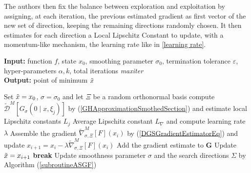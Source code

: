 The authors then fix the balance between exploration and exploitation by assigning, at each iteration, the previous estimated
gradient as first vector of the new set of direction, keeping the remaining directions randomly chosen. It then
estimates for each direction a Local Lipschitz Constant to update, with a momentum-like mechanism, the learning rate like in \ref{learning rate}.

\begin{algorithm}[!ht]
	\caption{ASGF algorithm}\label{ASGF}
	
	\hspace*{\algorithmicindent} \textbf{Input:} function $f$, state $x_0$, smoothing parameter $\sigma_0$, termination tolerance $\varepsilon$, hyper-parameters $\alpha, k$, total iterations \textit{maxiter}\\
	\hspace*{\algorithmicindent} \textbf{Output:} point of minimum $\Tilde{x}$
	\begin{algorithmic}[1]
		
		\State Set $\Tilde{x} = x_0$, $\sigma = \sigma_0$ and let $\Xi$ be a random orthonormal basis
		\State compute $ \widetilde{\mathcal{D}}^{M}\left[G_{\sigma}\left(0 \mid x, \xi_{j}\right)\right] $ by (\ref{GHApproximationSmothedSection}) and estimate local Lipschitz constants $L_j$
		\EndFor
		\State Average Lipschitz constant $L_\nabla$ and compute learning rate $\lambda$
		\State Assemble the gradient $ \widetilde{\nabla}_{\sigma, \Xi}^{M}[F](x_i) $ by (\ref{DGSGradientEstimatorEq}) and update $ x_{i+1}=x_{i}-\lambda \widetilde{\nabla}_{\sigma, \Xi}^{M}[F](x_i) $
		\State Add the gradient estimate to $\mathbf{G}$
		\State Update $\Tilde{x} = x_{i+1}$
		\EndIf
		\State \textbf{break}
		\Else
		\State Update smoothness parameter $\sigma$ and the search directions $\Sigma$ by Algorithm (\ref{subroutineASGF})
		\EndIf
		\EndFor
		
	\end{algorithmic}
\end{algorithm}


